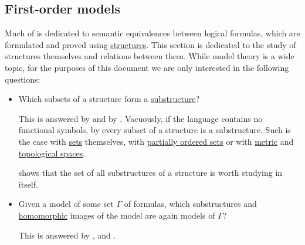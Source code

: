 \subsection{First-order models}\label{subsec:first_order_models}

Much of  is dedicated to semantic equivalences between logical formulas, which are formulated and proved using \hyperref[def:first_order_structure]{structures}. This section is dedicated to the study of structures themselves and relations between them. While model theory is a wide topic, for the purposes of this document we are only interested in the following questions:

\begin{itemize}
  \item Which subsets of a structure form a \hyperref[def:first_order_substructure]{substructure}?

  This is answered by  and by . Vacuously, if the language contains no functional symbols, by  every subset of a structure is a substructure. Such is the case with \hyperref[def:set]{sets} themselves, with \hyperref[def:partially_ordered_set]{partially ordered sets} or with \hyperref[def:metric_space]{metric} and \hyperref[def:topological_space]{topological spaces}.

   shows that the set of all substructures of a structure is worth studying in itself.

  \item Given a model of some set \( \Gamma \) of formulas, which substructures and \hyperref[def:first_order_homomorphism]{homomorphic} images of the model are again models of \( \Gamma \)?

  This is answered by ,  and .
\end{itemize}

